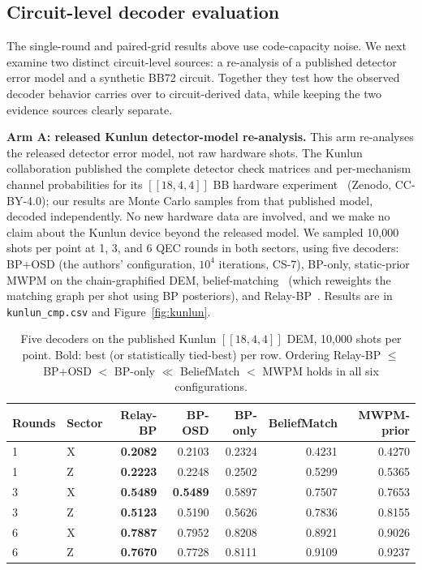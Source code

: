 \documentclass[pdflatex,sn-mathphys-num]{sn-jnl}
\theoremstyle{thmstyleone}
\theoremstyle{thmstyletwo}
\theoremstyle{thmstylethree}
\begin{document}
\subsection{Circuit-level decoder evaluation}
\label{sec:circuit}

The single-round and paired-grid results above use code-capacity noise. We next examine two distinct circuit-level sources: a re-analysis of a published detector error model and a synthetic BB72 circuit. Together they test how the observed decoder behavior carries over to circuit-derived data, while keeping the two evidence sources clearly separate.

\noindent\textbf{Arm A: released Kunlun detector-model re-analysis.} This arm re-analyses the released detector error model, not raw hardware shots. The Kunlun collaboration published the complete detector check matrices and per-mechanism channel probabilities for its $[[18,4,4]]$ BB hardware experiment~\cite{Wang2026kunlun} (Zenodo, CC-BY-4.0); our results are Monte Carlo samples from that published model, decoded independently. No new hardware data are involved, and we make no claim about the Kunlun device beyond the released model. We sampled 10{,}000 shots per point at 1, 3, and 6 QEC rounds in both sectors, using five decoders: BP+OSD (the authors' configuration, $10^4$ iterations, CS-7), BP-only, static-prior MWPM on the chain-graphified DEM, belief-matching~\cite{Higgott2023belief} (which reweights the matching graph per shot using BP posteriors), and Relay-BP~\cite{Muller2025relay}. Results are in \texttt{kunlun\_cmp.csv} and Figure~\ref{fig:kunlun}.

\begin{table}[!htbp]\centering\small
\caption{Five decoders on the published Kunlun $[[18,4,4]]$ DEM, 10{,}000 shots per point. Bold: best (or statistically tied-best) per row. Ordering Relay-BP $\leq$ BP+OSD $<$ BP-only $\ll$ BeliefMatch $<$ MWPM holds in all six configurations.}
\label{tab:kunlun}
\begin{tabular}{@{}llrrrrr@{}}
\toprule
Rounds & Sector & Relay-BP & BP-OSD & BP-only & BeliefMatch & MWPM-prior \\\midrule
1 & X & \textbf{0.2082} & 0.2103 & 0.2324 & 0.4231 & 0.4270 \\
1 & Z & \textbf{0.2223} & 0.2248 & 0.2502 & 0.5299 & 0.5365 \\
3 & X & \textbf{0.5489} & \textbf{0.5489} & 0.5897 & 0.7507 & 0.7653 \\
3 & Z & \textbf{0.5123} & 0.5190 & 0.5626 & 0.7836 & 0.8155 \\
6 & X & \textbf{0.7887} & 0.7952 & 0.8208 & 0.8921 & 0.9026 \\
6 & Z & \textbf{0.7670} & 0.7728 & 0.8111 & 0.9109 & 0.9237 \\
\bottomrule
\end{tabular}
\end{table}
\end{document}
